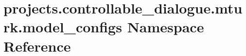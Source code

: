 \hypertarget{namespaceprojects_1_1controllable__dialogue_1_1mturk_1_1model__configs}{}\section{projects.\+controllable\+\_\+dialogue.\+mturk.\+model\+\_\+configs Namespace Reference}
\label{namespaceprojects_1_1controllable__dialogue_1_1mturk_1_1model__configs}
